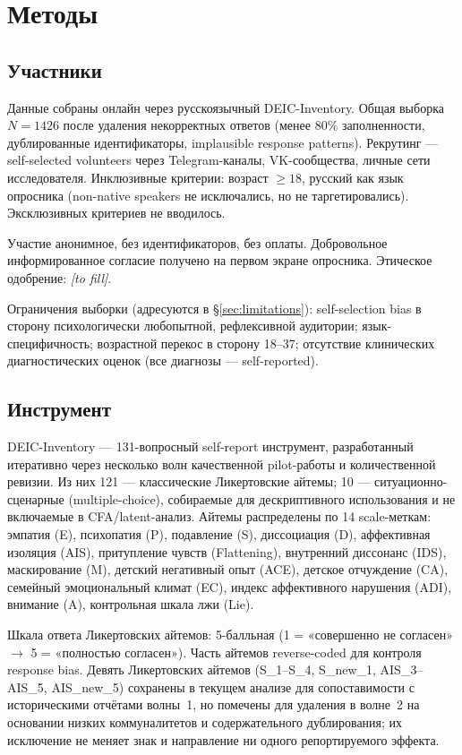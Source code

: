 \section{Методы}
\label{sec:methods}

\subsection{Участники}

Данные собраны онлайн через русскоязычный DEIC-Inventory. Общая выборка $N = 1426$ после удаления некорректных ответов (менее 80\% заполненности, дублированные идентификаторы, implausible response patterns). Рекрутинг --- self-selected volunteers через Telegram-каналы, VK-сообщества, личные сети исследователя. Инклюзивные критерии: возраст $\geq 18$, русский как язык опросника (non-native speakers не исключались, но не таргетировались). Эксклюзивных критериев не вводилось.

Участие анонимное, без идентификаторов, без оплаты. Добровольное информированное согласие получено на первом экране опросника. Этическое одобрение: \textit{[to fill]}.

Ограничения выборки (адресуются в §\ref{sec:limitations}): self-selection bias в сторону психологически любопытной, рефлексивной аудитории; язык-специфичность; возрастной перекос в сторону 18--37; отсутствие клинических диагностических оценок (все диагнозы --- self-reported).

\subsection{Инструмент}

DEIC-Inventory --- 131-вопросный self-report инструмент, разработанный итеративно через несколько волн качественной pilot-работы и количественной ревизии. Из них 121 --- классические Ликертовские айтемы; 10 --- ситуационно-сценарные (multiple-choice), собираемые для дескриптивного использования и не включаемые в CFA/latent-анализ. Айтемы распределены по 14 scale-меткам: эмпатия (E), психопатия (P), подавление (S), диссоциация (D), аффективная изоляция (AIS), притупление чувств (Flattening), внутренний диссонанс (IDS), маскирование (M), детский негативный опыт (ACE), детское отчуждение (CA), семейный эмоциональный климат (EC), индекс аффективного нарушения (ADI), внимание (A), контрольная шкала лжи (Lie).

Шкала ответа Ликертовских айтемов: 5-балльная (1 = «совершенно не согласен» $\to$ 5 = «полностью согласен»). Часть айтемов reverse-coded для контроля response bias. Девять Ликертовских айтемов (S\_1--S\_4, S\_new\_1, AIS\_3--AIS\_5, AIS\_new\_5) сохранены в текущем анализе для сопоставимости с историческими отчётами волны~1, но помечены для удаления в волне~2 на основании низких коммуналитетов и содержательного дублирования; их исключение не меняет знак и направление ни одного репортируемого эффекта.

